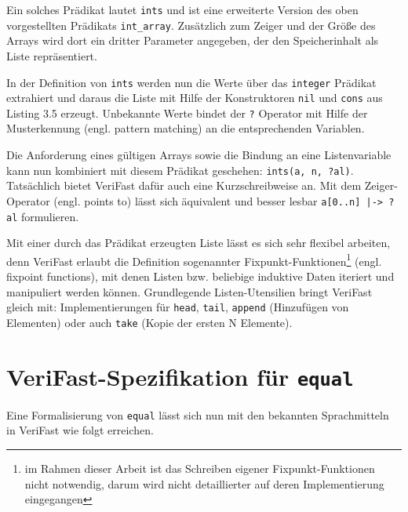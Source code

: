 Ein solches Prädikat lautet \lstinline{ints} und ist eine erweiterte Version des oben vorgestellten Prädikats
\lstinline{int_array}. Zusätzlich zum Zeiger und der Größe des Arrays wird dort ein dritter Parameter angegeben, der
den Speicherinhalt als Liste repräsentiert. 



In der Definition von \lstinline{ints} werden nun die Werte über das \lstinline{integer} Prädikat extrahiert und
daraus die Liste mit Hilfe der Konstruktoren \lstinline{nil} und \lstinline{cons} aus Listing 3.5 erzeugt. Unbekannte
Werte bindet der \lstinline{?} Operator mit Hilfe der Musterkennung (engl. pattern matching) an die entsprechenden
Variablen.

Die Anforderung eines gültigen Arrays sowie die Bindung an eine Listenvariable kann nun kombiniert mit diesem Prädikat
geschehen: \lstinline{ints(a, n, ?al)}. Tatsächlich bietet VeriFast dafür auch eine Kurzschreibweise an. Mit dem Zeiger-Operator
(engl. points to) lässt sich äquivalent und besser lesbar \lstinline{a[0..n] |-> ?al} formulieren.

Mit einer durch das Prädikat erzeugten Liste lässt es sich sehr flexibel arbeiten, denn VeriFast erlaubt 
die Definition sogenannter Fixpunkt-Funktionen\footnote{im Rahmen dieser Arbeit ist das Schreiben eigener
Fixpunkt-Funktionen nicht notwendig, darum wird nicht detaillierter auf deren Implementierung eingegangen} (engl. fixpoint functions), 
mit denen Listen bzw. beliebige induktive Daten iteriert und manipuliert werden können. Grundlegende
Listen-Utensilien bringt VeriFast gleich mit: Implementierungen für \lstinline{head}, 
\lstinline{tail}, \lstinline{append} (Hinzufügen von Elementen) oder auch \lstinline{take} 
(Kopie der ersten N Elemente).


\section{VeriFast-Spezifikation für \texttt{equal}}
\label{sec:design-by-contract:VeriFast-variante}

Eine Formalisierung von \texttt{equal} lässt sich nun mit den bekannten Sprachmitteln in VeriFast wie folgt
erreichen.



